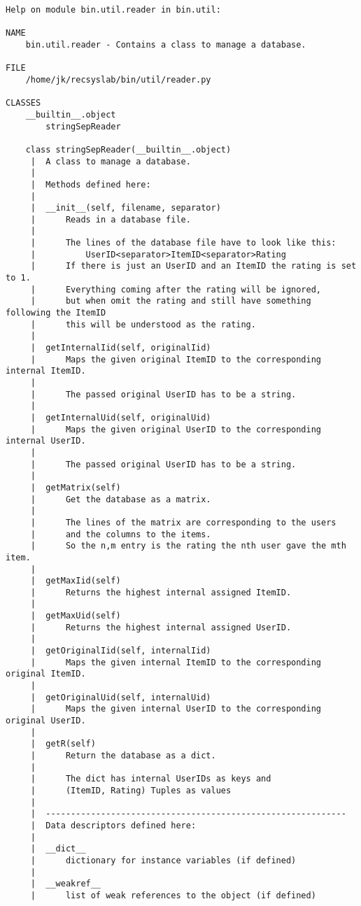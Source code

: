 \begin{lstlisting}
Help on module bin.util.reader in bin.util:

NAME
    bin.util.reader - Contains a class to manage a database.

FILE
    /home/jk/recsyslab/bin/util/reader.py

CLASSES
    __builtin__.object
        stringSepReader
    
    class stringSepReader(__builtin__.object)
     |  A class to manage a database.
     |  
     |  Methods defined here:
     |  
     |  __init__(self, filename, separator)
     |      Reads in a database file.
     |      
     |      The lines of the database file have to look like this:
     |          UserID<separator>ItemID<separator>Rating
     |      If there is just an UserID and an ItemID the rating is set to 1.
     |      Everything coming after the rating will be ignored,
     |      but when omit the rating and still have something following the ItemID
     |      this will be understood as the rating.
     |  
     |  getInternalIid(self, originalIid)
     |      Maps the given original ItemID to the corresponding internal ItemID.
     |      
     |      The passed original UserID has to be a string.
     |  
     |  getInternalUid(self, originalUid)
     |      Maps the given original UserID to the corresponding internal UserID.
     |      
     |      The passed original UserID has to be a string.
     |  
     |  getMatrix(self)
     |      Get the database as a matrix.
     |      
     |      The lines of the matrix are corresponding to the users
     |      and the columns to the items.
     |      So the n,m entry is the rating the nth user gave the mth item.
     |  
     |  getMaxIid(self)
     |      Returns the highest internal assigned ItemID.
     |  
     |  getMaxUid(self)
     |      Returns the highest internal assigned UserID.
     |  
     |  getOriginalIid(self, internalIid)
     |      Maps the given internal ItemID to the corresponding original ItemID.
     |  
     |  getOriginalUid(self, internalUid)
     |      Maps the given internal UserID to the corresponding original UserID.
     |  
     |  getR(self)
     |      Return the database as a dict.
     |      
     |      The dict has internal UserIDs as keys and
     |      (ItemID, Rating) Tuples as values
     |  
     |  ------------------------------------------------------------
     |  Data descriptors defined here:
     |  
     |  __dict__
     |      dictionary for instance variables (if defined)
     |  
     |  __weakref__
     |      list of weak references to the object (if defined)
\end{lstlisting}

